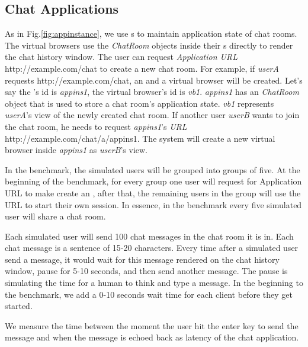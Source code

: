 \subsection{Chat Applications}
As in Fig.\ref{fig:appinstance},
we use \appins{}s to maintain application state of chat rooms.
The virtual browsers use the \emph{ChatRoom} objects inside their \appins{}s 
directly to render the chat history window.
The user can request \emph{Application URL} http://example.com/chat
to create a new chat room.
For example, if 
\emph{userA} requests http://example.com/chat,
an \appins{} and a virtual browser will be created.
Let's say the \appins{}'s id is \emph{appins1},
the virtual browser's id is \emph{vb1}.
\emph{appins1} has an \emph{ChatRoom} object that is used to store 
a chat room's application state.
\emph{vb1} represents \emph{userA}'s view of the newly created
chat room.
If another user \emph{userB} wants to join the chat room, 
he needs to request \emph{appins1}'s \emph{\appins{} URL} 
http://example.com/chat/a/appins1.
The system will create a new virtual browser inside \emph{appins1}
as \emph{userB}'s view.


In the benchmark, 
the simulated users will be grouped into groups of five.
At the beginning of the benchmark, 
for every group one user will request for Application URL to make 
\cb{} create an \appins{},
after that, the remaining users in the group will use the \appins{} URL to start
their own session.
In essence, in the benchmark every five simulated user will share a chat room.

Each simulated user will send 100 chat messages in the chat room it is in.
Each chat message is a sentence of 15-20 characters.
Every time after a simulated user send a message,
it would wait for this message rendered on the chat history window,
pause for 5-10 seconds,
and then send another message.
The pause is simulating the time for a human to think and type a message.
In the beginning to the benchmark, 
we add a 0-10 seconds wait time for each client before they get started.

We measure the time between the moment 
the user hit the enter key to send the message and
when the message is echoed back as latency of the chat application.



